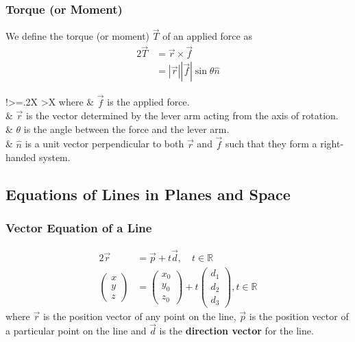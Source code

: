 \documentclass{report}
\newcommand\R{\mathbb{R}}
\theoremstyle{definition}
\numberwithin{equation}{section}
\begin{document}
\subsubsection*{Torque (or Moment)}
We define the torque (or moment) $\vec T$ of an applied force as
\begin{alignat}{2}
	\vec T &= \vec r \times \vec f \\
				 &= |\vec r||\vec f| \sin \theta \hat n
\end{alignat}
\begin{tabularx}{\textwidth}{!{\extracolsep{\fill}}>{\hsize=.2\hsize}X >{\hsize}X}
	where & $\vec f$ is the applied force. \\
				& $\vec r$ is the vector determined by the lever arm acting from the axis of rotation. \\
				& $\theta$ is the angle between the force and the lever arm. \\
				& $\hat n$ is a unit vector perpendicular to both $\vec r$ and $\vec f$ such that they form a right-handed system.
\end{tabularx}

\subsection{Equations of Lines in Planes and Space}

\subsubsection{Vector Equation of a Line}
\begin{alignat}{2}
	\vec r &= \vec p + t \vec d, \quad t \in \R 
	\\
	\begin{pmatrix}
		x \\ y \\ z
	\end{pmatrix} 
	&= 
	\begin{pmatrix}
		x_0 \\ y_0 \\ z_0
	\end{pmatrix}
	+ t
	\begin{pmatrix}
		d_1 \\ d_2 \\ d_3
	\end{pmatrix}
	, t \in \R
\end{alignat}
where $\vec r$ is the position vector of any point on the line, $\vec p$ is the position vector of a particular point on the line and $\vec d$ is the \textbf{direction vector} for the line.
\end{document}
